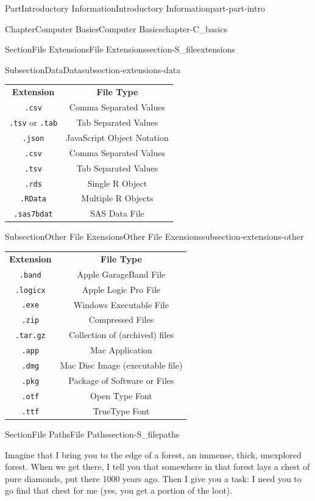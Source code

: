 \documentclass[oneside,10pt,]{book}
\newcommand{\tabularfont}{\relax}
\newcommand{\mono}[1]{\texttt{#1}}
\begin{document}
\begin{partptx}{Part}{Introductory Information}{}{Introductory Information}{}{}{part-part-intro}
\begin{chapterptx}{Chapter}{Computer Basics}{}{Computer Basics}{}{}{chapter-C_basics}
\begin{sectionptx}{Section}{File Extensions}{}{File Extensions}{}{}{section-S_fileextensions}
\begin{subsectionptx}{Subsection}{Data}{}{Data}{}{}{subsection-extensions-data}
\begin{center}%
{\tabularfont%
\begin{tabular}{cc}
{\bfseries{}Extension}&{\bfseries{}File Type}\tabularnewline[0pt]
\mono{.csv}&Comma Separated Values\tabularnewline[0pt]
\mono{.tsv} or \mono{.tab}&Tab Separated Values\tabularnewline[0pt]
\mono{.json}&JavaScript Object Notation\tabularnewline[0pt]
\mono{.csv}&Comma Separated Values\tabularnewline[0pt]
\mono{.tsv}&Tab Separated Values\tabularnewline[0pt]
\mono{.rds}&Single R Object\tabularnewline[0pt]
\mono{.RData}&Multiple R Objects\tabularnewline[0pt]
\mono{.sas7bdat}&SAS Data File
\end{tabular}
}%
\end{center}%
\end{subsectionptx}
%
%
\typeout{************************************************}
\typeout{************************************************}
%
\begin{subsectionptx}{Subsection}{Other File Exensions}{}{Other File Exensions}{}{}{subsection-extensions-other}
%
\begin{center}%
{\tabularfont%
\begin{tabular}{cc}
{\bfseries{}Extension}&{\bfseries{}File Type}\tabularnewline[0pt]
\mono{.band}&Apple GarageBand File\tabularnewline[0pt]
\mono{.logicx}&Apple Logic Pro File\tabularnewline[0pt]
\mono{.exe}&Windows Executable File\tabularnewline[0pt]
\mono{.zip}&Compressed Files\tabularnewline[0pt]
\mono{.tar.gz}&Collection of (archived) files\tabularnewline[0pt]
\mono{.app}&Mac Application\tabularnewline[0pt]
\mono{.dmg}&Mac Disc Image (executable file)\tabularnewline[0pt]
\mono{.pkg}&Package of Software or Files\tabularnewline[0pt]
\mono{.otf}&Open Type Font\tabularnewline[0pt]
\mono{.ttf}&TrueType Font
\end{tabular}
}%
\end{center}%
\end{subsectionptx}
\end{sectionptx}
%
%
\typeout{************************************************}
\typeout{************************************************}
%
\begin{sectionptx}{Section}{File Paths}{}{File Paths}{}{}{section-S_filepaths}
%
%
\begin{introduction}{}%
Imagine that I bring you to the edge of a forest, an immense, thick, unexplored forest. When we get there, I tell you that somewhere in that forest lays a chest of pure diamonds, put there 1000 years ago. Then I give you a task: I need you to go find that chest for me (yes, you get a portion of the loot).%

\end{introduction}
\end{sectionptx}
\end{chapterptx}
\end{partptx}
\end{document}
